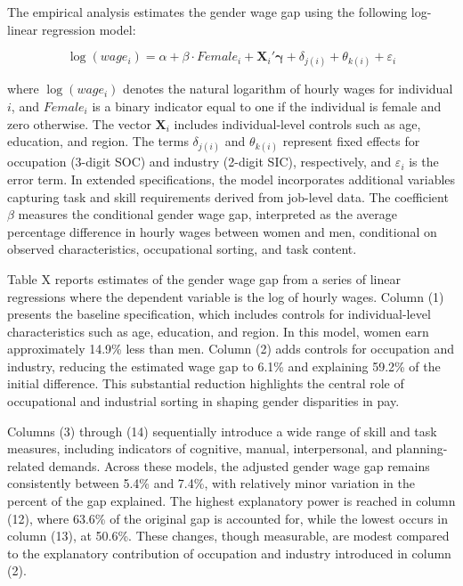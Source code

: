 
The empirical analysis estimates the gender wage gap using the following log-linear regression model:

\begin{equation}
\log(wage_i) = \alpha + \beta \cdot Female_i + \mathbf{X}_i'\boldsymbol{\gamma} + \delta_{j(i)} + \theta_{k(i)} + \varepsilon_i
\end{equation}

where $\log(wage_i)$ denotes the natural logarithm of hourly wages for individual $i$, and $Female_i$ is a binary 
indicator equal to one if the individual is female and zero otherwise. The vector $\mathbf{X}_i$ includes individual-level 
controls such as age, education, and region. The terms $\delta_{j(i)}$ and $\theta_{k(i)}$ represent fixed effects for occupation 
(3-digit SOC) and industry (2-digit SIC), respectively, and $\varepsilon_i$ is the error term. In extended specifications, the model 
incorporates additional variables capturing task and skill requirements derived from job-level data. The coefficient $\beta$ measures 
the conditional gender wage gap, interpreted as the average percentage difference in hourly wages between women and men, conditional 
on observed characteristics, occupational sorting, and task content.


Table X reports estimates of the gender wage gap from a series of linear regressions where the 
dependent variable is the log of hourly wages. Column (1) presents the baseline specification, 
which includes controls for individual-level characteristics such as age, education, and region. 
In this model, women earn approximately 14.9\% less than men. Column (2) adds controls for occupation and industry, reducing the estimated wage 
gap to 6.1\% and explaining 59.2\% of the initial difference. This substantial reduction highlights the 
central role of occupational and industrial sorting in shaping gender disparities in pay.

Columns (3) through (14) sequentially introduce a wide range of skill and task measures, including 
indicators of cognitive, manual, interpersonal, and planning-related demands. Across these models, 
the adjusted gender wage gap remains consistently between 5.4\% and 7.4\%, with relatively minor variation 
in the percent of the gap explained. The highest explanatory power is reached in column (12), where 63.6\% of 
the original gap is accounted for, while the lowest occurs in column (13), at 50.6\%. These changes, though 
measurable, are modest compared to the explanatory contribution of occupation and industry introduced in column (2).

